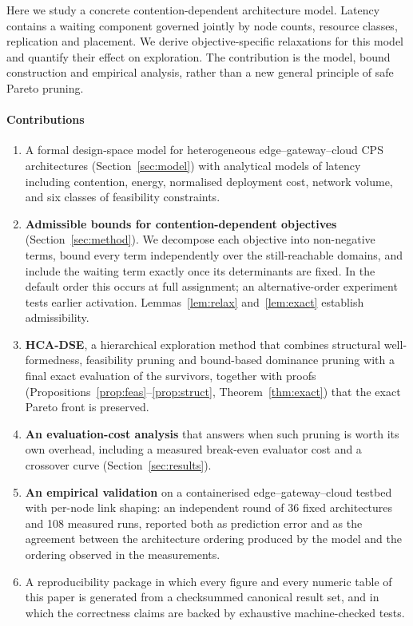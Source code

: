 Here we study a concrete contention-dependent architecture model. Latency
contains a waiting component governed jointly by node counts, resource classes,
replication and placement. We derive objective-specific relaxations for this
model and quantify their effect on exploration. The contribution is the model,
bound construction and empirical analysis, rather than a new general principle
of safe Pareto pruning.

\paragraph{Contributions}
\begin{enumerate}
\item A formal design-space model for heterogeneous edge--gateway--cloud CPS
  architectures (Section~\ref{sec:model}) with analytical models of latency including
  contention, energy, normalised deployment cost, network volume, and six classes of
  feasibility constraints.
\item \textbf{Admissible bounds for contention-dependent objectives}
  (Section~\ref{sec:method}). We decompose each objective into non-negative terms,
  bound every term independently over the still-reachable domains, and include the waiting term exactly once its determinants are fixed.
  In the default order this occurs at full assignment; an alternative-order experiment tests earlier activation. Lemmas~\ref{lem:relax} and~\ref{lem:exact} establish
  admissibility.
\item \textbf{HCA-DSE}, a hierarchical exploration method that combines structural
  well-formedness, feasibility pruning and bound-based dominance pruning with a final
  exact evaluation of the survivors, together with proofs
  (Propositions~\ref{prop:feas}--\ref{prop:struct}, Theorem~\ref{thm:exact}) that the
  exact Pareto front is preserved.
\item \textbf{An evaluation-cost analysis} that answers when such pruning is worth its
  own overhead, including a measured break-even evaluator cost and a crossover curve
  (Section~\ref{sec:results}).
\item \textbf{An empirical validation} on a containerised edge--gateway--cloud testbed
  with per-node link shaping: an independent round of 36 fixed architectures and 108 measured runs, reported both as
  prediction error and as the agreement between the architecture ordering produced by
  the model and the ordering observed in the measurements.
\item A reproducibility package in which every figure and every numeric table of this
  paper is generated from a checksummed canonical result set, and in which the
  correctness claims are backed by exhaustive machine-checked tests.
\end{enumerate}

